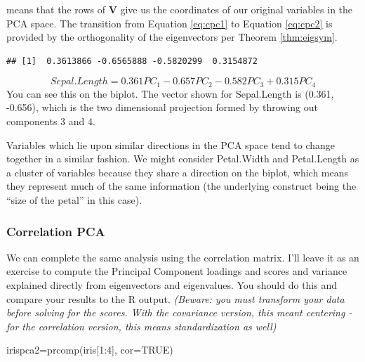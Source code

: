 \documentclass[
]{article}
\newenvironment{Shaded}{\begin{snugshade}}{\end{snugshade}}
\newcommand{\AttributeTok}[1]{\textcolor[rgb]{0.77,0.63,0.00}{#1}}
\newcommand{\CommentTok}[1]{\textcolor[rgb]{0.56,0.35,0.01}{\textit{#1}}}
\newcommand{\ConstantTok}[1]{\textcolor[rgb]{0.00,0.00,0.00}{#1}}
\newcommand{\DecValTok}[1]{\textcolor[rgb]{0.00,0.00,0.81}{#1}}
\newcommand{\FunctionTok}[1]{\textcolor[rgb]{0.00,0.00,0.00}{#1}}
\newcommand{\NormalTok}[1]{#1}
\newcommand{\OtherTok}[1]{\textcolor[rgb]{0.56,0.35,0.01}{#1}}
\newcommand{\SpecialCharTok}[1]{\textcolor[rgb]{0.00,0.00,0.00}{#1}}
\theoremstyle{definition}
\theoremstyle{definition}
\theoremstyle{definition}
\theoremstyle{definition}
\theoremstyle{remark}
\begin{document}
means that the rows of \(\mathbf{V}\) give us the coordinates of our original variables in the PCA space. The transition from Equation \eqref{eq:cpc1} to Equation \eqref{eq:cpc2} is provided by the orthogonality of the eigenvectors per Theorem \ref{thm:eigsym}.

\begin{Shaded}
\end{Shaded}

\begin{verbatim}
## [1]  0.3613866 -0.6565888 -0.5820299  0.3154872
\end{verbatim}

\[Sepal.Length = 0.361 PC_1 - 0.657 PC_2 - 0.582 PC_3 + 0.315 PC_4\]
You can see this on the biplot. The vector shown for Sepal.Length is (0.361, -0.656), which is the two dimensional projection formed by throwing out components 3 and 4.

Variables which lie upon similar directions in the PCA space tend to change together in a similar fashion. We might consider Petal.Width and Petal.Length as a cluster of variables because they share a direction on the biplot, which means they represent much of the same information (the underlying construct being the ``size of the petal'' in this case).

\hypertarget{correlation-pca}{%
\subsubsection{Correlation PCA}\label{correlation-pca}}

We can complete the same analysis using the correlation matrix. I'll leave it as an exercise to compute the Principal Component loadings and scores and variance explained directly from eigenvectors and eigenvalues. You should do this and compare your results to the R output. \emph{(Beware: you must transform your data before solving for the scores. With the covariance version, this meant centering - for the correlation version, this means standardization as well)}

\begin{Shaded}
\begin{Highlighting}[]
\NormalTok{irispca2}\OtherTok{=}\FunctionTok{prcomp}\NormalTok{(iris[}\DecValTok{1}\SpecialCharTok{:}\DecValTok{4}\NormalTok{], }\AttributeTok{cor=}\ConstantTok{TRUE}\NormalTok{)}
\end{Highlighting}
\end{Shaded}
\end{document}
